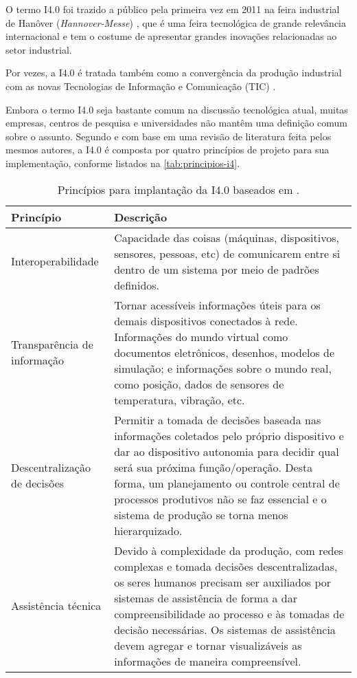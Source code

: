 	O termo I4.0 foi trazido a público pela primeira vez em 2011 na feira industrial de Hanôver (\textit{Hannover-Messe}) \cite{kagermann2011industrie}, que é uma feira tecnológica de grande relevância internacional e tem o costume de apresentar grandes inovações relacionadas ao setor industrial.

	Por vezes, a I4.0 é tratada também como a convergência da produção industrial com as novas Tecnologias de Informação e Comunicação (TIC) \cite{hermann2016design}.
	
	Embora o termo I4.0 seja bastante comum na discussão tecnológica atual, muitas empresas, centros de pesquisa e universidades não mantêm uma definição comum sobre o assunto. Segundo  e com base em uma revisão de literatura feita pelos mesmos autores, a I4.0 é composta por quatro princípios de projeto para sua implementação, conforme listados na \autoref{tab:principios-i4}.
	
	\begin{table}[htb]
		\centering
		\footnotesize
		\label{tab:principios-i4}
		\begin{tabular}{p{3cm}p{12cm}}
			\hline
			\textbf{Princípio} & \textbf{Descrição} \\
			
			\hline
			Interoperabilidade &
			Capacidade das coisas (máquinas, dispositivos, sensores, pessoas, etc) de comunicarem entre si dentro de um sistema por meio de padrões definidos. \\
			
			\hline
			Transparência de informação &
			Tornar acessíveis informações úteis para os demais dispositivos conectados à rede. Informações do mundo virtual como documentos eletrônicos, desenhos, modelos de simulação; e informações sobre o mundo real, como posição, dados de sensores de temperatura, vibração, etc. \\
			
			\hline
			Descentralização de decisões &
			Permitir a tomada de decisões baseada nas informações coletados pelo próprio dispositivo e dar ao dispositivo autonomia para decidir qual será sua próxima função/operação. Desta forma, um planejamento ou controle central de processos produtivos não se faz essencial e o sistema de produção se torna menos hierarquizado. \\
			
			\hline
			Assistência técnica &
			Devido à complexidade da produção, com redes complexas e tomada decisões descentralizadas, os seres humanos precisam ser auxiliados por sistemas de assistência de forma a dar compreensibilidade ao processo e às tomadas de decisão necessárias. Os sistemas de assistência devem agregar e tornar visualizáveis as informações de maneira compreensível. \\
			
			\hline
		\end{tabular}
		\caption{Princípios para implantação da I4.0 baseados em .}
	\end{table}

